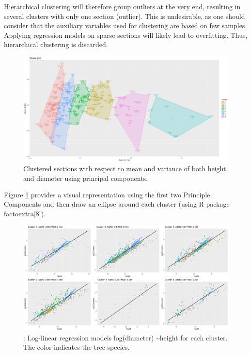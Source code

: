 Hierarchical clustering will therefore group outliers at the very end, resulting in several clusters with only one section (outlier). This is undesirable, as one should consider that the auxiliary variables used for clustering are based on few samples. Applying regression models on sparse sections will likely lead to overfitting. Thus, hierarchical clustering is discarded.

\begin{figure}[H]
\centering
  \includegraphics[scale = 0.85]{appendix_cluster.png}
  \caption{Clustered sections with respect to mean and variance of both height and diameter using principal components.}
  \label{fig:appendix_cluster}
\end{figure}

Figure \ref{fig:appendix_cluster} provides a visual representation using the first two Principle Components and then draw an ellipse around each cluster (using R package factoextra[8]). 

\begin{figure}[H]
\centering
  \includegraphics[scale = 0.85]{multi_regression.png}
  \caption{: Log-linear regression models log(diameter) \textasciitilde height for each cluster. The color indicates the tree species.}
  \label{fig:multi_regression}
\end{figure}



